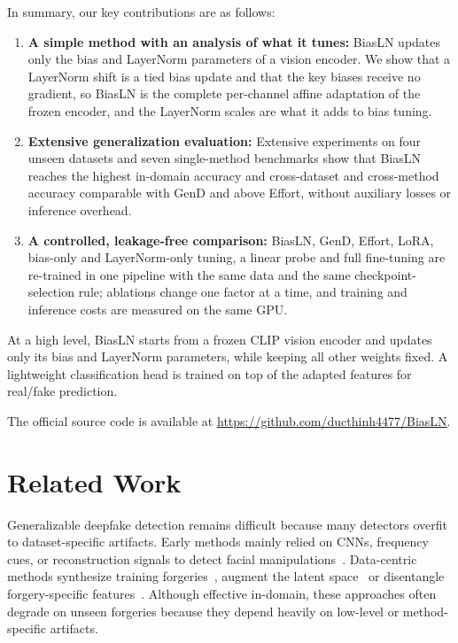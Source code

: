 \documentclass[fonts]{icst}
\newif\ifrevmark\revmarkfalse
\newcommand{\rev}[1]{\ifrevmark{\color{revblue}#1}\else#1\fi}
\begin{document}
In summary, our key contributions are as follows:
\begin{enumerate}
    \item \textbf{A simple \rev{method with an analysis of what it tunes}:} BiasLN updates only the bias and LayerNorm parameters of a vision encoder. \rev{We show that a LayerNorm shift is a tied bias update and that the key biases receive no gradient, so BiasLN is the complete per-channel affine adaptation of the frozen encoder, and the LayerNorm scales are what it adds to bias tuning.}

    \item \textbf{Extensive generalization evaluation:} Extensive experiments on \rev{four} unseen datasets and seven single-method benchmarks \rev{show that BiasLN reaches the highest in-domain accuracy and cross-dataset and cross-method accuracy comparable with GenD and above Effort, without auxiliary losses or inference overhead.}

    \item \rev{\textbf{A controlled, leakage-free comparison:} BiasLN, GenD, Effort, LoRA, bias-only and LayerNorm-only tuning, a linear probe and full fine-tuning are re-trained in one pipeline with the same data and the same checkpoint-selection rule; ablations change one factor at a time, and training and inference costs are measured on the same GPU.}
\end{enumerate}
At a high level, BiasLN starts from a frozen CLIP vision encoder and updates only its bias and LayerNorm parameters, while keeping all other weights fixed.
A lightweight classification head is trained on top of the adapted features for real/fake prediction.

The official source code \rev{is available} at \href{https://github.com/ducthinh4477/BiasLN}{\rev{https://github.com/ducthinh4477/BiasLN}}.


\section{Related Work}

Generalizable deepfake detection remains difficult because many detectors overfit to dataset-specific artifacts. Early methods mainly relied on CNNs, frequency cues, or reconstruction signals to detect facial manipulations~\cite{rossler2019ff,qian2020frequency,luo2021srm,liu2021spsl,cao2022recce,badr2025wavit}. \rev{Data-centric methods synthesize training forgeries~\cite{shiohara2022sbi,chen2022sladd,lin2024cdfa}, augment the latent space~\cite{yan2024latent} or disentangle forgery-specific features~\cite{yan2023ucf,huang2023iid}.} Although effective in-domain, these approaches often degrade on unseen forgeries because they depend heavily on low-level or method-specific artifacts.
\end{document}
